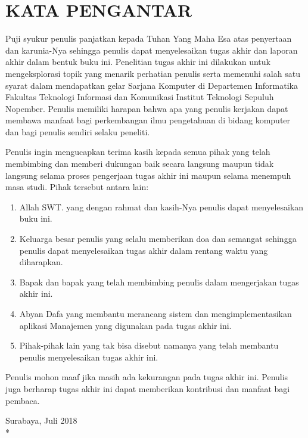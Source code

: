 \chapter {KATA PENGANTAR}

Puji syukur penulis panjatkan kepada Tuhan Yang Maha Esa atas penyertaan dan karunia-Nya sehingga penulis dapat menyelesaikan tugas akhir dan laporan akhir dalam bentuk buku ini. Penelitian tugas akhir ini dilakukan untuk mengeksplorasi topik yang menarik perhatian penulis serta memenuhi salah satu syarat dalam mendapatkan gelar Sarjana Komputer di Departemen Informatika Fakultas Teknologi Informasi dan Komunikasi Institut Teknologi Sepuluh Nopember. Penulis memiliki harapan bahwa apa yang penulis kerjakan dapat membawa manfaat bagi perkembangan ilmu pengetahuan di bidang komputer dan bagi penulis sendiri selaku peneliti.

Penulis ingin mengucapkan terima kasih kepada semua pihak yang telah membimbing dan memberi dukungan baik secara langsung maupun tidak langsung selama proses pengerjaan tugas akhir ini maupun selama menempuh masa studi. Pihak tersebut antara lain:

\begin {enumerate}
	\item Allah SWT. yang dengan rahmat dan kasih-Nya penulis dapat menyelesaikan buku ini.
    \item Keluarga besar penulis yang selalu memberikan doa dan semangat sehingga penulis dapat menyelesaikan tugas akhir dalam rentang waktu yang diharapkan. 
    \item Bapak \pembimbingsatu dan bapak \pembimbingdua yang telah membimbing penulis dalam mengerjakan tugas akhir ini.
    \item Abyan Dafa yang membantu merancang sistem dan mengimplementasikan aplikasi Manajemen yang digunakan pada tugas akhir ini.
    \item Pihak-pihak lain yang tak bisa disebut namanya yang telah membantu penulis menyelesaikan tugas akhir ini.
\end {enumerate}

Penulis mohon maaf jika masih ada kekurangan pada tugas akhir ini. Penulis juga berharap tugas akhir ini dapat memberikan kontribusi dan manfaat bagi pembaca.

\begin{flushright}
Surabaya, Juli 2018 \\*
\vspace{5em}
\penulis
\end{flushright}